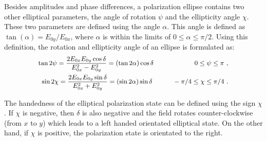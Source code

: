 Besides amplitudes and phase differences, a polarization ellipse contains two other elliptical parameters, the angle of rotation $\psi$ and the ellipticity angle $\chi$.
These two parameters are defined using the angle $\alpha$.
This angle is defined as $\tan(\alpha) = E_{0y}/E_{0x}$, where $\alpha$ is within the limits of $ 0\leq \alpha \leq \pi/2$.
Using this definition, the rotation and ellipticity angle of an ellipse is formulated as: 
\begin{subequations}\label{eq:eq8}
\small
	\begin{align}
	\tan 2\psi = \frac{2E_{0x}E_{0y}\cos\delta }{E_{0x}^{2}-E_{0y}^{2}} = (\tan 2\alpha) \cos\delta  \hspace{2 cm}  0\leq \psi \leq \pi~, \\
	\sin 2\chi =\frac{2E_{0x}E_{0y}\sin\delta }{E_{0x}^{2}+E_{0y}^{2}}= (\sin 2\alpha) \sin\delta  \hspace{1 cm}   -\pi/4\leq \chi\leq \pi/4~.
	\end{align}
\end{subequations}

The handedness of the elliptical polarization state can be defined using the sign $\chi$.
If $\chi$ is negative, then  $\delta$ is also negative and the field rotates counter-clockwise (from $x$ to $y$) which leads to a left handed orientated elliptical state.
On the other hand, if $\chi$ is positive, the polarization state is orientated to the right.
